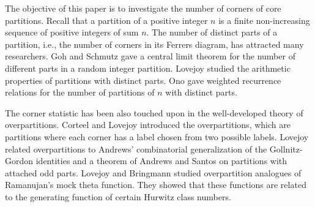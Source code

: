 \documentclass[a4paper,12pt]{article}
\newtheorem{thm}{Theorem}[section]
\begin{document}


The objective of this paper is to investigate the  number of corners  of core partitions.
Recall that a partition of a positive integer $n$ is a finite non-increasing sequence of positive integers of sum $n$.
The number of distinct parts of a partition, i.e., the number of corners in its Ferrers diagram, has attracted many researchers.
Goh and Schmutz \cite{GS95} gave a central limit theorem for the number of different parts in a random integer partition. Lovejoy \cite{lovejoy01} studied the arithmetic properties of partitions with distinct parts. Ono \cite{Ono98} gave  weighted recurrence relations  for the number of partitions of $n$ with distinct parts.

%
%

%
%
%

The corner statistic has been also touched upon in the well-developed theory of overpartitions. Corteel and  Lovejoy \cite{lovejoy04} introduced the overpartitions, which are partitions where each corner has a label chosen from two possible labels.
Lovejoy \cite{lovejoy04b} related  overpartitions to Andrews' combinatorial generalization of the Gollnitz-Gordon identities and a theorem of Andrews and Santos on partitions with attached odd parts.
Lovejoy and Bringmann \cite{lovejoy09} studied overpartition analogues of Ramanujan's mock theta function. They showed that these functions are related to the generating function of certain Hurwitz class numbers.
\end{document}
